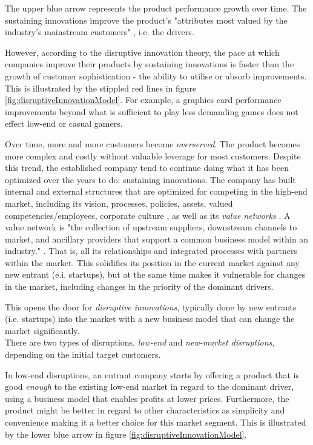 \documentclass[a4paper,10pt]{article}
\begin{document}
The upper blue arrow represents the product performance growth over time. The sustaining innovations improve 
the product's "attributes most valued by the industry's mainstream customers" \cite{innovatorsSolution}, i.e. the drivers. 

However, according to the disruptive innovation theory, the pace at which companies improve their products by sustaining innovations is faster than 
the growth of customer sophistication - the ability to utilise or absorb improvements. 
This is illustrated by the stippled red lines in figure \ref{fig:disruptiveInnovationModel}. 
For example, a graphics card performance improvements 
beyond what is sufficient to play less demanding games does not effect low-end or casual gamers.

Over time, more and more customers become \emph{overserved}. The product becomes more complex and costly without valuable leverage for most customers. 
Despite this trend, the established company tend to continue doing what it has been optimized over the years to do: sustaining innovations.
The company has built internal and external structures that are optimized for competing in the high-end market, 
including its vision, processes, policies, assets, valued competencies/employees, corporate culture \cite{scientificArticlePredictingTheUnpredictable}, 
as well as its \emph{value networks} \cite{innovatorsDilemma}.
A value network is "the collection of upstream suppliers, downstream channels to market, 
  and ancillary providers that support a common business model within an industry." \cite{innovatorsDilemma}. 
That is, all its relationships and integrated processes with partners within the market.
This solidifies its position in the current market against any new entrant (e.i. startups), 
but at the same time makes it vulnerable for changes in the market, including changes in the priority of the dominant drivers.


This opens the door for \emph{disruptive innovations}, typically done by new entrants (i.e. startups) into the market with a new business model 
that can change the market significantly. \\

There are two types of disruptions, \emph{low-end} and \emph{new-market disruptions}, depending on the initial target customers.

In low-end disruptions, an entrant company starts by offering a product that is good \emph{enough} to the existing low-end market in regard
to the dominant driver, using a business model that enables profits at lower prices. 
Furthermore, the product might be better in regard to other characteristics as simplicity and convenience \cite{innovatorsSolution} 
making it a better choice for this market segment.
This is illustrated by the lower blue arrow in figure \ref{fig:disruptiveInnovationModel}.
\end{document}
